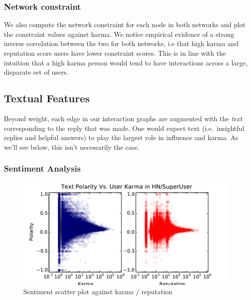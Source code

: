 \documentclass[11pt]{article}
\begin{document}
\subsubsection{Network constraint}

We also compute the network constraint for each node in both networks and plot
the constraint values against karma. We notice empirical evidence of a strong
inverse correlation between the two for both networks, i.e that high karma and
reputation score users have lower constraint scores. This is in line with the
intuition that a high karma person would tend to have interactions across a
large, disparate set of users.


\subsection{Textual Features}

Beyond weight, each edge in our interaction graphs are augmented with the
\textit{text} corresponding to the reply that was made. One would expect 
text (i.e.\ insightful replies and helpful answers) to play the largest role 
in influence and karma. As we'll see below, this isn't necessarily the case.

\subsubsection{Sentiment Analysis}
\label{sec:sentiment}
\begin{figure}[h]
\centering
\includegraphics[width=\linewidth]{text_polarity}
\caption{Sentiment scatter plot against karma / reputation}
\label{fig:sentiment}
\end{figure}
\end{document}
